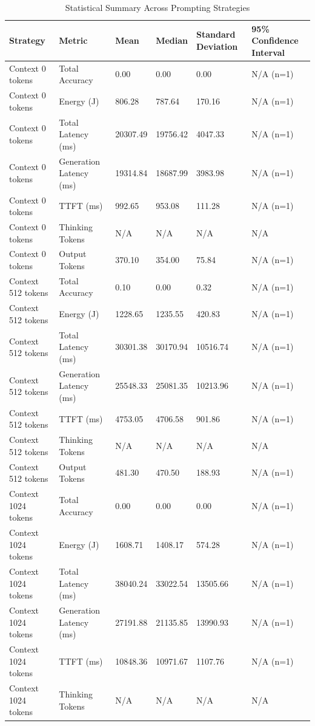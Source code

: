 \begin{table}
\caption{Statistical Summary Across Prompting Strategies}
\label{tab:statistical_summary}
\begin{tabular}{llllll}
\toprule
Strategy & Metric & Mean & Median & Standard Deviation & 95\% Confidence Interval \\
\midrule
Context 0 tokens & Total Accuracy & 0.00 & 0.00 & 0.00 & N/A (n=1) \\
Context 0 tokens & Energy (J) & 806.28 & 787.64 & 170.16 & N/A (n=1) \\
Context 0 tokens & Total Latency (ms) & 20307.49 & 19756.42 & 4047.33 & N/A (n=1) \\
Context 0 tokens & Generation Latency (ms) & 19314.84 & 18687.99 & 3983.98 & N/A (n=1) \\
Context 0 tokens & TTFT (ms) & 992.65 & 953.08 & 111.28 & N/A (n=1) \\
Context 0 tokens & Thinking Tokens & N/A & N/A & N/A & N/A \\
Context 0 tokens & Output Tokens & 370.10 & 354.00 & 75.84 & N/A (n=1) \\
Context 512 tokens & Total Accuracy & 0.10 & 0.00 & 0.32 & N/A (n=1) \\
Context 512 tokens & Energy (J) & 1228.65 & 1235.55 & 420.83 & N/A (n=1) \\
Context 512 tokens & Total Latency (ms) & 30301.38 & 30170.94 & 10516.74 & N/A (n=1) \\
Context 512 tokens & Generation Latency (ms) & 25548.33 & 25081.35 & 10213.96 & N/A (n=1) \\
Context 512 tokens & TTFT (ms) & 4753.05 & 4706.58 & 901.86 & N/A (n=1) \\
Context 512 tokens & Thinking Tokens & N/A & N/A & N/A & N/A \\
Context 512 tokens & Output Tokens & 481.30 & 470.50 & 188.93 & N/A (n=1) \\
Context 1024 tokens & Total Accuracy & 0.00 & 0.00 & 0.00 & N/A (n=1) \\
Context 1024 tokens & Energy (J) & 1608.71 & 1408.17 & 574.28 & N/A (n=1) \\
Context 1024 tokens & Total Latency (ms) & 38040.24 & 33022.54 & 13505.66 & N/A (n=1) \\
Context 1024 tokens & Generation Latency (ms) & 27191.88 & 21135.85 & 13990.93 & N/A (n=1) \\
Context 1024 tokens & TTFT (ms) & 10848.36 & 10971.67 & 1107.76 & N/A (n=1) \\
Context 1024 tokens & Thinking Tokens & N/A & N/A & N/A & N/A \\

\end{tabular}
\end{table}
